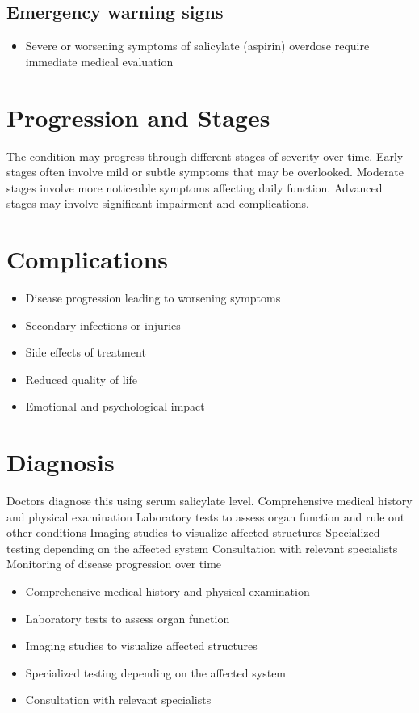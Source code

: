 \subsection{Emergency warning signs}
\begin{itemize}[noitemsep]
  \item Severe or worsening symptoms of salicylate (aspirin) overdose require immediate medical evaluation
\end{itemize}
\section{Progression and Stages}
The condition may progress through different stages of severity over time. Early stages often involve mild or subtle symptoms that may be overlooked. Moderate stages involve more noticeable symptoms affecting daily function. Advanced stages may involve significant impairment and complications.
\section{Complications}
\begin{itemize}[noitemsep]
  \item Disease progression leading to worsening symptoms
  \item Secondary infections or injuries
  \item Side effects of treatment
  \item Reduced quality of life
  \item Emotional and psychological impact
\end{itemize}
\section{Diagnosis}
Doctors diagnose this using serum salicylate level. Comprehensive medical history and physical examination Laboratory tests to assess organ function and rule out other conditions Imaging studies to visualize affected structures Specialized testing depending on the affected system Consultation with relevant specialists Monitoring of disease progression over time

\begin{itemize}[noitemsep]
  \item Comprehensive medical history and physical examination
  \item Laboratory tests to assess organ function
  \item Imaging studies to visualize affected structures
  \item Specialized testing depending on the affected system
  \item Consultation with relevant specialists
\end{itemize}
